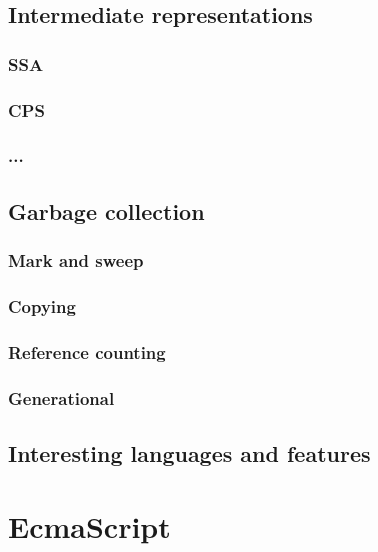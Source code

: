 \subsection{Intermediate representations}
\subsubsection{SSA}
\subsubsection{CPS}
\subsubsection{...}
\subsection{Garbage collection}
\subsubsection{Mark and sweep}
\subsubsection{Copying}
\subsubsection{Reference counting}
\subsubsection{Generational}
\subsection{Interesting languages and features}

\section{EcmaScript}
